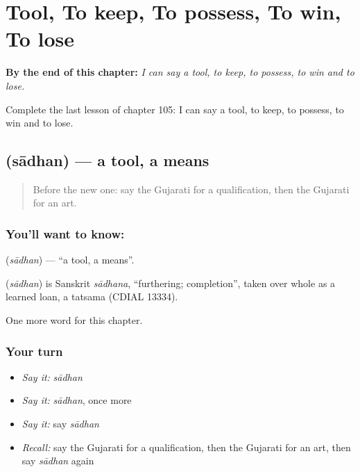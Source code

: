 
\chapter{Tool, To keep, To possess, To win, To lose}
\label{ch:gu-tool-to-keep-to-possess-to-win-to-lose}

\begin{chapteropening}
\textbf{By the end of this chapter:} \emph{I can say a tool, to keep, to possess, to win and to lose.}

Complete the last lesson of chapter 105: I can say a tool, to keep, to possess, to win and to lose.
\end{chapteropening}

\section[\texorpdfstring{\gu{સાધન} (sādhan)}{સાધન (sādhan)}]{ (sādhan) — a tool, a means}

\label{lesson:GU-C105-sadhan}



\begin{quote}
Before the new one: say the Gujarati for a qualification, then the Gujarati for an art.
\end{quote}

\subsection*{You'll want to know: }
\textbf{} (\emph{sādhan}) — \textquotedblleft{}a tool, a means\textquotedblright{}.

\begin{cousinweb}
\textbf{} (\emph{sādhan}) is Sanskrit \emph{sādhana}, \textquotedblleft{}furthering; completion\textquotedblright{}, taken over whole as a learned loan, a tatsama (CDIAL 13334).
\end{cousinweb}

\begin{grammarlens}[title={What you've built}]
One more word for this chapter.
\end{grammarlens}

\subsection*{Your turn}
\begin{itemize}
\raggedright
  \item \emph{Say it:} \emph{sādhan}
  \item \emph{Say it:} \emph{sādhan}, once more
  \item \emph{Say it:} say \emph{sādhan}
  \item \emph{Recall:} say the Gujarati for a qualification, then the Gujarati for an art, then say \emph{sādhan} again
\end{itemize}

